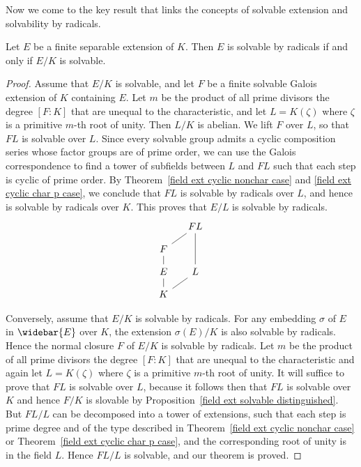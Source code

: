 Now we come to the key result that links the concepts of solvable extension and solvability by radicals.
\begin{theorem}\label{field ext solvable iff solvable by radical}
Let $E$ be a finite separable extension of $K$. Then $E$ is solvable by radicals if and only if $E/K$ is solvable.
\end{theorem}
\begin{proof}
Assume that $E/K$ is solvable, and let $F$ be a finite solvable Galois extension of $K$ containing $E$. Let $m$ be the product of all prime divisors the degree $[F:K]$ that are unequal to the characteristic, and let $L=K(\zeta)$ where $\zeta$ is a primitive $m$-th root of unity. Then $L/K$ is abelian. We lift $F$ over $L$, so that $FL$ is solvable over $L$. Since every solvable group admits a cyclic composition series whose factor groups are of prime order, we can use the Galois correspondence to find a tower of subfields between $L$ and $FL$ such that each step is cyclic of prime order. By Theorem~\ref{field ext cyclic nonchar case} and \ref{field ext cyclic char p case}, we conclude that $FL$ is solvable by radicals over $L$, and hence is solvable by radicals over $K$. This proves that $E/L$ is solvable by radicals.
\[\begin{tikzcd}[column sep=small,row sep=small]
&FL\\
F\ar[ru,no head]&\\
E\ar[u,no head]&L\ar[uu,no head]\\
K\ar[u,no head]\ar[ru,no head]&
\end{tikzcd}\]

Conversely, assume that $E/K$ is solvable by radicals. For any embedding $\sigma$ of $E$ in $\widebar{E}$ over $K$, the extension $\sigma(E)/K$ is also solvable by radicals. Hence the normal closure $F$ of $E/K$ is solvable by radicals. Let $m$ be the product of all prime divisors the degree $[F:K]$ that are unequal to the characteristic and again let $L=K(\zeta)$ where $\zeta$ is a primitive $m$-th root of unity. It will suffice to prove that $FL$ is solvable over $L$, because it follows then that $FL$ is solvable over $K$ and hence $F/K$ is slovable by Proposition~\ref{field ext solvable distinguished}. But $FL/L$ can be decomposed into a tower of extensions, such that each step is prime degree and of the type described in Theorem~\ref{field ext cyclic nonchar case} or Theorem~\ref{field ext cyclic char p case}, and the corresponding root of unity is in the field $L$. Hence $FL/L$ is solvable, and our theorem is proved.
\end{proof}

